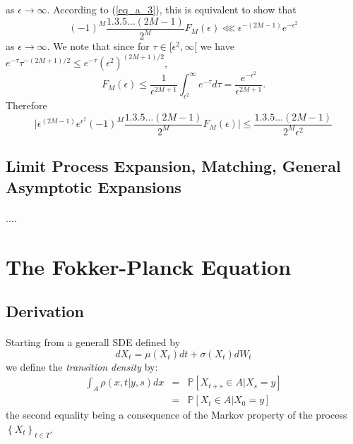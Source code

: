 \documentclass{article}
\begin{document}
\begin{appendices}
\begin{equation}
\end{equation}
%
as $\epsilon\rightarrow\infty$. According to (\ref{eq_a_3}), this is equivalent to show that 
%
\begin{equation}
(-1)^M\frac{1.3.5\ldots(2M-1)}{2^M}F_M(\epsilon) \lll \epsilon^{-(2M-1)}e^{-\epsilon^2}
\end{equation}
%
as $\epsilon\rightarrow\infty$. We note that since for $\tau\in [\epsilon^2,\infty[$ we have $e^{-\tau}\tau^{-(2M + 1) / 2}\leq e^{-\tau}(\epsilon^2)^{(2M+1)/2}$,
%
\begin{equation}
F_M(\epsilon) \leq\frac{1}{\epsilon^{2M+1}}\int^\infty_{\epsilon^2}e^{-\tau}d\tau = \frac{e^{-\epsilon^2}}{\epsilon^{2M+1}}.
\end{equation}
%
Therefore
%
\begin{equation}
\Big\vert\epsilon^{(2M-1)}e^{\epsilon^2}(-1)^M\frac{1.3.5\ldots(2M-1)}{2^M}F_M(\epsilon)\Big\vert \leq \frac{1.3.5\ldots(2M-1)}{2^M\epsilon^2} 
\end{equation}
%
\subsection{Limit Process Expansion, Matching, General Asymptotic Expansions}
\end{appendices}
%
\paragraph{} ....
%
\section{The Fokker-Planck Equation} 
%
\subsection{Derivation}
%
\paragraph{} Starting from a generall SDE defined by
%
\begin{equation}
dX_t=\mu(X_t)dt + \sigma(X_t)dW_t
\end{equation}
%
we define the \emph{transition density} by:
%
\begin{eqnarray}
%
\int_A\rho(x, t\vert y, s)dx & = & \mathbb{P}[X_{t+s}\in A\vert X_s = y]\nonumber\\
& = & \mathbb{P}[X_t\in A\vert X_0 = y]
%
\end{eqnarray}
%
the second equality being a consequence of the Markov property of the process $\left\{X_t\right\}_{t\in T}$.
%
\end{document}
